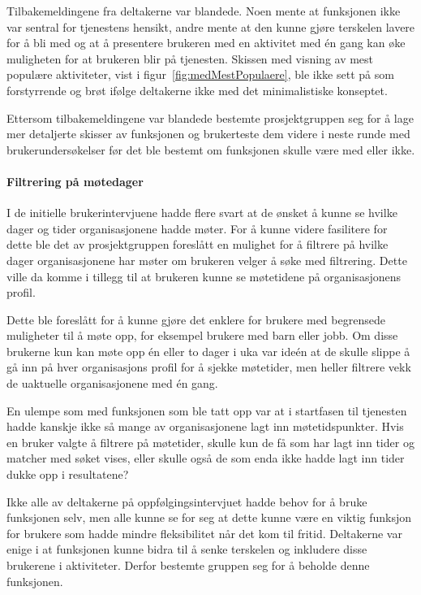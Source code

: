 Tilbakemeldingene fra deltakerne var blandede. Noen mente at funksjonen ikke var sentral for tjenestens hensikt, andre mente at den kunne gjøre terskelen lavere for å bli med og at å presentere brukeren med en aktivitet med én gang kan øke muligheten for at brukeren blir på tjenesten. Skissen med visning av mest populære aktiviteter, vist i figur~\ref{fig:medMestPopulaere}, ble ikke sett på som forstyrrende og brøt ifølge deltakerne ikke med det minimalistiske konseptet. 

Ettersom tilbakemeldingene var blandede bestemte prosjektgruppen seg for å lage mer detaljerte skisser av funksjonen og brukerteste dem videre i neste runde med brukerundersøkelser før det ble bestemt om funksjonen skulle være med eller ikke.

\paragraph{Filtrering på møtedager}
I de initielle brukerintervjuene hadde flere svart at de ønsket å kunne se hvilke dager og tider organisasjonene hadde møter. For å kunne videre fasilitere for dette ble det av prosjektgruppen foreslått en mulighet for å filtrere på hvilke dager organisasjonene har møter om brukeren velger å søke med filtrering. Dette ville da komme i tillegg til at brukeren kunne se møtetidene på organisasjonens profil. 

Dette ble foreslått for å kunne gjøre det enklere for brukere med begrensede muligheter til å møte opp, for eksempel brukere med barn eller jobb. Om disse brukerne kun kan møte opp én eller to dager i uka var ideén at de skulle slippe å gå inn på hver organisasjons profil for å sjekke møtetider, men heller filtrere vekk de uaktuelle organisasjonene med én gang.

En ulempe som med funksjonen som ble tatt opp var at i startfasen til tjenesten hadde kanskje ikke så mange av organisasjonene lagt inn møtetidspunkter. Hvis en bruker valgte å filtrere på møtetider, skulle kun de få som har lagt inn tider og matcher med søket vises, eller skulle også de som enda ikke hadde lagt inn tider dukke opp i resultatene?

Ikke alle av deltakerne på oppfølgingsintervjuet hadde behov for å bruke funksjonen selv, men alle kunne se for seg at dette kunne være en viktig funksjon for brukere som hadde mindre fleksibilitet når det kom til fritid. Deltakerne var enige i at funksjonen kunne bidra til å senke terskelen og inkludere disse brukerene i aktiviteter. Derfor bestemte gruppen seg for å beholde denne funksjonen.

